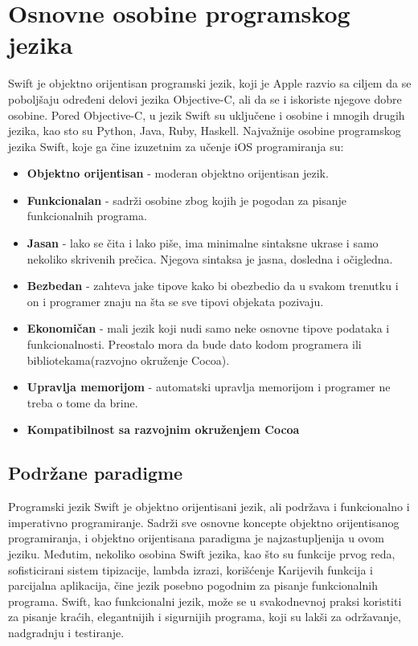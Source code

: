 \documentclass[a4paper]{article}
\begin{document}
\section{Osnovne osobine programskog jezika}	
\label{sec:treciDeo}

Swift je objektno orijentisan programski jezik, koji je Apple razvio sa ciljem da 
se poboljšaju određeni delovi jezika Objective-C, ali da se i iskoriste njegove
dobre osobine. Pored Objective-C, u jezik Swift su uključene i osobine i mnogih drugih jezika,
kao sto su Python, Java, Ruby, Haskell. Najvažnije osobine programskog jezika Swift, koje ga čine izuzetnim za učenje iOS programiranja su:
\begin{itemize}
\item\textbf{Objektno orijentisan} - moderan objektno orijentisan jezik.
\item\textbf{Funkcionalan} - sadrži osobine zbog kojih je pogodan za pisanje funkcionalnih programa.
\item\textbf{Jasan} - lako se čita i lako piše, ima minimalne sintaksne ukrase i samo nekoliko skrivenih prečica. Njegova sintaksa je jasna, dosledna i očigledna.
\item\textbf{Bezbedan} - zahteva jake tipove kako bi obezbedio da u svakom trenutku i on i programer znaju na šta se sve tipovi objekata pozivaju.
\item\textbf{Ekonomičan} - mali jezik koji nudi samo neke osnovne tipove podataka i funkcionalnosti. Preostalo mora da bude dato kodom programera ili bibliotekama(razvojno okruženje Cocoa).
\item\textbf{Upravlja memorijom} - automatski upravlja memorijom i programer ne treba o tome da brine.
\item\textbf{Kompatibilnost sa razvojnim okruženjem Cocoa}
\end{itemize}

\subsection{Podržane paradigme}
\label{subsec:podnaslovParadigma}

Programski jezik Swift je objektno orijentisani jezik, ali podržava i funkcionalno i imperativno
programiranje. Sadrži sve osnovne koncepte objektno orijentisanog programiranja, i objektno orijentisana paradigma je najzastupljenija u ovom jeziku. Međutim, nekoliko osobina Swift jezika, kao što su funkcije prvog reda, sofisticirani sistem tipizacije, lambda izrazi, korišćenje Karijevih funkcija i parcijalna aplikacija, čine jezik posebno pogodnim za pisanje funkcionalnih programa. Swift, kao funkcionalni jezik, može se u svakodnevnoj praksi koristiti za pisanje kraćih, elegantnijih i sigurnijih programa, koji su lakši za održavanje, nadgradnju i testiranje.
\end{document}
